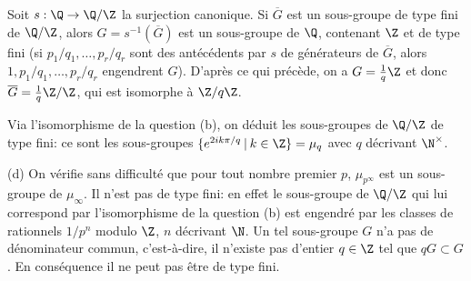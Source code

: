 {{Soit $s:\Q\rightarrow \Q/\Z$ la surjection canonique. Si $\overline G$ est un
sous-groupe de type fini de $\Q/\Z$, alors $G=s^{-1}(\overline G)$ est un sous-groupe de
$\Q$, contenant $\Z$ et de type fini (si $p_1/q_1,\ldots,p_r/q_r$ sont des ant\'ec\'edents
par $s$ de g\'en\'erateurs de $\overline G$, alors $1,p_1/q_1,\ldots,p_r/q_r$ engendrent $G$).
D'apr\`es ce qui pr\'ec\`ede, on a $G= \frac{1}{q}\Z$ et donc $\overline G =
\frac{1}{q}\Z/\Z$, qui est isomorphe \`a $\Z/q\Z$.
\smallskip

Via l'isomorphisme de la question (b), on d\'eduit les sous-groupes de $\Q/\Z$ de type fini:
ce sont les sous-groupes $\{e^{2ik\pi/q}\hskip 2pt |\hskip 2pt  k\in \Z\} = \mu_q$ avec $q$
d\'ecrivant
$\N^\times$. \smallskip

(d) On v\'erifie sans difficult\'e que pour tout nombre premier $p$, $\mu_{p^\infty}$ est
un sous-groupe de $\mu_\infty$. Il n'est pas de type fini: en effet le sous-groupe de
$\Q/\Z$ qui lui correspond par l'isomorphisme de la question (b) est engendr\'e par les
classes de rationnels $1/p^n$ modulo $\Z$, $n$ d\'ecrivant $\N$. Un tel sous-groupe $G$ n'a
pas de d\'enominateur commun, c'est-\`a-dire, il n'existe pas d'entier $q\in \Z$ tel que
$qG\subset G$. En cons\'equence il ne peut pas \^etre de type fini.
}
}
